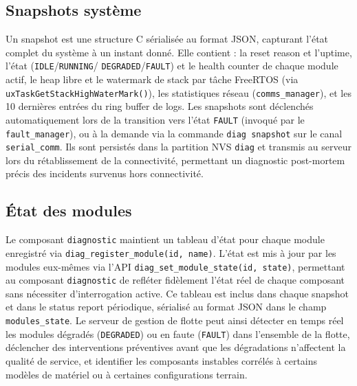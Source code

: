 \subsection{Snapshots système}
\label{subsec:diag_snap}

Un snapshot est une structure C sérialisée au format JSON, capturant
l'état complet du système à un instant donné. Elle contient : la
reset reason et l'uptime, l'état (\texttt{IDLE}/\texttt{RUNNING}/
\texttt{DEGRADED}/\texttt{FAULT}) et le health counter de chaque
module actif, le heap libre et le watermark de stack par tâche
FreeRTOS (via \texttt{uxTaskGetStackHighWaterMark()}), les statistiques
réseau (\texttt{comms\_manager}), et les 10 dernières entrées du
ring buffer de logs. Les snapshots sont déclenchés automatiquement
lors de la transition vers l'état \texttt{FAULT} (invoqué par le
\texttt{fault\_manager}), ou à la demande via la commande
\texttt{diag snapshot} sur le canal \texttt{serial\_comm}. Ils sont
persistés dans la partition NVS \texttt{diag} et transmis au serveur
lors du rétablissement de la connectivité, permettant un diagnostic
post-mortem précis des incidents survenus hors connectivité.

\subsection{État des modules}
\label{subsec:diag_mods}

Le composant \texttt{diagnostic} maintient un tableau d'état pour
chaque module enregistré via \texttt{diag\_register\_module(id, name)}.
L'état est mis à jour par les modules eux-mêmes via l'API
\texttt{diag\_set\_module\_state(id, state)}, permettant au composant
\texttt{diagnostic} de refléter fidèlement l'état réel de chaque
composant sans nécessiter d'interrogation active. Ce tableau est
inclus dans chaque snapshot et dans le status report périodique,
sérialisé au format JSON dans le champ \texttt{modules\_state}. Le
serveur de gestion de flotte peut ainsi détecter en temps réel les
modules dégradés (\texttt{DEGRADED}) ou en faute (\texttt{FAULT})
dans l'ensemble de la flotte, déclencher des interventions préventives
avant que les dégradations n'affectent la qualité de service, et
identifier les composants instables corrélés à certains modèles de
matériel ou à certaines configurations terrain.

